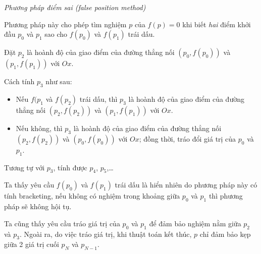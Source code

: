 \documentclass[../../Lectures]{subfiles}
\begin{document}
\begin{method}
    \emph{Phương pháp điểm sai (false position method)}

    Phương pháp này cho phép tìm nghiệm \(p\) của \(f(p) = 0\) khi biết
    \emph{hai} điểm khởi đầu \(p_0\) và \(p_1\) sao cho \(f(p_0)\) và \(f(p_1)\)
    trái dấu.

    Đặt \(p_2\) là hoành độ của giao điểm của đường thẳng nối \((p_0, f(p_0))\)
    và \((p_1, f(p_1))\) với \(Ox\).

    Cách tính \(p_3\) như sau:

    \begin{itemize}
        \item Nếu \(f(p_1\) và \(f(p_2)\) trái dấu, thì \(p_3\) là hoành độ của
            giao điểm của đường thẳng nối \((p_2, f(p_2))\) và \((p_1, f(p_1))\)
            với \(Ox\).

        \item Nếu không, thì \(p_3\) là hoành độ của giao điểm của đường thẳng
            nối \((p_2, f(p_2))\) và \((p_0, f(p_0))\)  với \(Ox\); đồng thời,
            tráo đổi giá trị của \(p_0\) và \(p_1\).
    \end{itemize}

    Tương tự với \(p_3\), tính được \(p_4\), \(p_5\),\ldots
\end{method}

Ta thấy yêu cầu \(f(p_0)\) và \(f(p_1)\) trái dấu là hiển nhiên do phương pháp
này có tính bracketing, nếu không có nghiệm trong khoảng giữa \(p_0\) và \(p_1\)
thì phương pháp sẽ không hội tụ.

Ta cũng thấy yêu cầu tráo giá trị của \(p_0\) và \(p_1\) để đảm bảo nghiệm nằm
giữa \(p_2\) và \(p_3\). Ngoài ra, do việc tráo giá trị, khi thuật toán kết
thúc, \(p\) chỉ đảm bảo kẹp giữa 2 giá trị cuối \(p_N\) và \(p_{N - 1}\).
\end{document}
